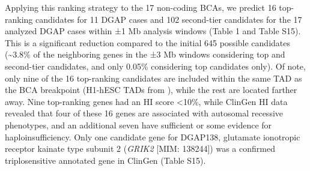 \documentclass[a4paper,twoside=true,openright,parskip=full,chapterprefix=true,11pt,headings=normal,bibliography=totoc,listof=totoc,titlepage=on,captions=tableabove,draft=false]{scrreprt}
\theoremstyle{definition}
\theoremstyle{definition}
\theoremstyle{definition}
\theoremstyle{remark}
\begin{document}
Applying this ranking strategy to the 17 non-coding BCAs, we predict 16
top-ranking candidates for 11 DGAP cases and 102 second-tier candidates
for the 17 analyzed DGAP cases within ±1 Mb analysis windows (Table 1
and Table S15). This is a significant reduction compared to the initial
645 possible candidates (\textasciitilde{}3.8\% of the neighboring genes
in the ±3 Mb windows considering top and second-tier candidates, and
only 0.05\% considering top candidates only). Of note, only nine of the
16 top-ranking candidates are included within the same TAD as the BCA
breakpoint (H1-hESC TADs from \citep{Dixon2012}), while the rest are
located farther away. Nine top-ranking genes had an HI score
\textless{}10\%,\citep{Huang2010} while ClinGen HI data revealed that
four of these 16 genes are associated with autosomal recessive
phenotypes, and an additional seven have sufficient or some evidence for
haploinsufficiency. Only one candidate gene for DGAP138, glutamate
ionotropic receptor kainate type subunit 2 (\emph{GRIK2} {[}MIM:
138244{]}) was a confirmed triplosensitive annotated gene in ClinGen
(Table S15).
\end{document}
